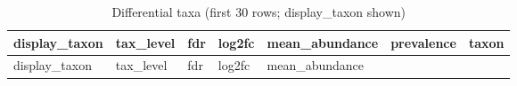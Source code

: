 \documentclass[
  letterpaper,
  DIV=11,
  numbers=noendperiod]{scrartcl}
\begin{document}
\begin{longtable}[]{@{}
  >{\raggedright\arraybackslash}p{}
  >{\raggedright\arraybackslash}p{}
  >{\raggedleft\arraybackslash}p{}
  >{\raggedleft\arraybackslash}p{}
  >{\raggedleft\arraybackslash}p{}
  >{\raggedleft\arraybackslash}p{}
  >{\raggedright\arraybackslash}p{}@{}}
\caption{Differential taxa (first 30 rows; display\_taxon
shown)}\tabularnewline
\toprule\noalign{}
\begin{minipage}[b]{\linewidth}\raggedright
display\_taxon
\end{minipage} & \begin{minipage}[b]{\linewidth}\raggedright
tax\_level
\end{minipage} & \begin{minipage}[b]{\linewidth}\raggedleft
fdr
\end{minipage} & \begin{minipage}[b]{\linewidth}\raggedleft
log2fc
\end{minipage} & \begin{minipage}[b]{\linewidth}\raggedleft
mean\_abundance
\end{minipage} & \begin{minipage}[b]{\linewidth}\raggedleft
prevalence
\end{minipage} & \begin{minipage}[b]{\linewidth}\raggedright
taxon
\end{minipage} \\
\midrule\noalign{}
\endfirsthead
\toprule\noalign{}
\begin{minipage}[b]{\linewidth}\raggedright
display\_taxon
\end{minipage} & \begin{minipage}[b]{\linewidth}\raggedright
tax\_level
\end{minipage} & \begin{minipage}[b]{\linewidth}\raggedleft
fdr
\end{minipage} & \begin{minipage}[b]{\linewidth}\raggedleft
log2fc
\end{minipage} & \begin{minipage}[b]{\linewidth}\raggedleft
mean\_abundance
\end{minipage} & \begin{minipage}[b]{\linewidth}\raggedleft

\end{minipage}
\end{longtable}
\end{document}
